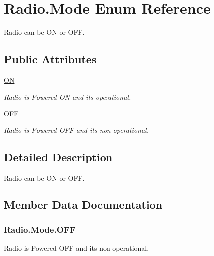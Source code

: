 \hypertarget{enum_radio_1_1_mode}{}\section{Radio.\+Mode Enum Reference}
\label{enum_radio_1_1_mode}


Radio can be O\+N or O\+F\+F.  


\subsection*{Public Attributes}
\begin{DoxyCompactItemize}
\item 
\hyperlink{enum_radio_1_1_mode_aab005e1aab4f9ae40cb5bcdcbb0be43b}{O\+N}
\begin{DoxyCompactList}\small\item\em Radio is Powered O\+N and its operational. \end{DoxyCompactList}\item 
\hyperlink{enum_radio_1_1_mode_aaf6269984ad1869fc570f1ce6ba377a9}{O\+F\+F}
\begin{DoxyCompactList}\small\item\em Radio is Powered O\+F\+F and its non operational. \end{DoxyCompactList}\end{DoxyCompactItemize}


\subsection{Detailed Description}
Radio can be O\+N or O\+F\+F. 

\subsection{Member Data Documentation}
\hypertarget{enum_radio_1_1_mode_aaf6269984ad1869fc570f1ce6ba377a9}{}
\subsubsection[{O\+F\+F}]{\setlength{\rightskip}{0pt plus 5cm}Radio.\+Mode.\+O\+F\+F}\label{enum_radio_1_1_mode_aaf6269984ad1869fc570f1ce6ba377a9}


Radio is Powered O\+F\+F and its non operational. 

\hypertarget{enum_radio_1_1_mode_aab005e1aab4f9ae40cb5bcdcbb0be43b}{}
